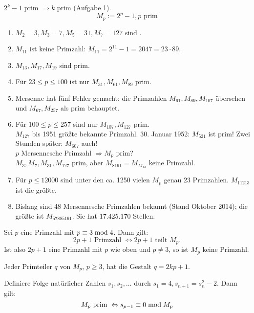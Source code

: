 	$2^k - 1$ prim $\Rightarrow k$ prim (Aufgabe 1).
	\[ M_p := 2^p - 1, p \text{ prim} \]

\begin{enumerate}[(1)]
	\item $M_2 = 3, M_3 = 7, M_5 = 31, M_7 = 127$ sind . 
	\item $M_{11}$ ist keine Primzahl: $M_{11} = 2^{11} - 1 = 2047 = 23 \cdot 89$.
	\item $M_{13}, M_{17}, M_{19}$ sind prim.
	\item Für $23 \leq p \leq 100$ ist nur $M_{31}, M_{61}, M_{89}$ prim.
	\item Mersenne hat fünf Fehler gemacht: die Primzahlen $M_{61}, M_{89}, M_{107}$ übersehen und $M_{67}, M_{257}$ als prim behauptet.
	\item Für $100 \leq p \leq 257$ sind nur $M_{107}, M_{127}$ prim. \\
	$M_{127}$ bis 1951 größte bekannte Primzahl. 30. Januar 1952: $M_{521}$ ist prim! Zwei Stunden später: $M_{607}$ auch! \\
	$p$ Mersennesche Primzahl $\Rightarrow M_p$ prim? \\
	$M_3, M_7, M_{31}, M_{127}$ prim, aber $M_{8191} = M_{M_{13}}$ keine Primzahl.
	\item Für $p \leq 12000$ sind unter den ca. 1250 vielen $M_p$ genau 23 Primzahlen. $M_{11213}$ ist die größte.
	\item Bislang sind 48 Mersennesche Primzahlen bekannt (Stand Oktober 2014); die größte ist $M_{57885161}$. Sie hat 17.425.170 Stellen.
\end{enumerate}

\setcounter{falko}{3}
\begin{falko} \label{F7.4}
	Sei $p$ eine Primzahl mit $p \equiv 3 \bmod 4$. Dann gilt:
	\[2p + 1 \text{ Primzahl } \Leftrightarrow 2p+1 \text{ teilt } M_p. \]
	Ist also $2p+1$ eine Primzahl mit $p$ wie oben und $p \neq 3$, so ist $M_p$ keine Primzahl.
\end{falko}

	Jeder Primteiler $q$ von $M_p$, $p \geq 3$, hat die Gestalt $q = 2kp + 1$.
	
\begin{falko} \label{F7.5}
	Definiere Folge natürlicher Zahlen $s_1, s_2, \dots$ durch $s_1 = 4, s_{n+1} = s_n^2 - 2$. Dann gilt: 
	\[ M_p \text{ prim } \Leftrightarrow s_{p-1} \equiv 0 \bmod M_p \]
\end{falko}

